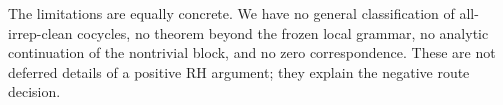 The limitations are equally concrete.  We have no general classification of
all-irrep-clean cocycles, no theorem beyond the frozen local grammar, no
analytic continuation of the nontrivial block, and no zero correspondence.
These are not deferred details of a positive RH argument; they explain the
negative route decision.

